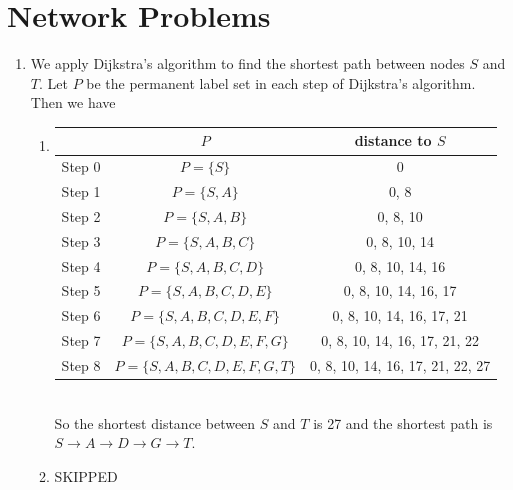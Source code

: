 \section{Network Problems}
\begin{enumerate}
    \item We apply Dijkstra's algorithm to find the shortest path between nodes \(S\) and \(T\). Let \(P\) be the permanent label set in each step of Dijkstra's algorithm. Then we have \\
          \begin{enumerate}[label=(\arabic*)]
              \item \begin{tabular}{|c|c|c|}
                        \hline
                               & \(P\)                                 & distance to \(S\)                \\
                        \hline
                        Step 0 & \(P = \{S\}\)                         & 0                                \\
                        Step 1 & \(P = \{S, A\}\)                      & 0, 8                             \\
                        Step 2 & \(P = \{S, A, B\}\)                   & 0, 8, 10                         \\
                        Step 3 & \(P = \{S, A, B, C\}\)                & 0, 8, 10, 14                     \\
                        Step 4 & \(P = \{S, A, B, C, D\}\)             & 0, 8, 10, 14, 16                 \\
                        Step 5 & \(P = \{S, A, B, C, D, E\}\)          & 0, 8, 10, 14, 16, 17             \\
                        Step 6 & \(P = \{S, A, B, C, D, E, F\}\)       & 0, 8, 10, 14, 16, 17, 21         \\
                        Step 7 & \(P = \{S, A, B, C, D, E, F, G\}\)    & 0, 8, 10, 14, 16, 17, 21, 22     \\
                        Step 8 & \(P = \{S, A, B, C, D, E, F, G, T\}\) & 0, 8, 10, 14, 16, 17, 21, 22, 27 \\
                        \hline
                    \end{tabular} \\
                    So the shortest distance between \(S\) and \(T\) is 27 and the shortest path is \(S \to A \to D \to G \to T\).
              \item {\color{red} SKIPPED}
          \end{enumerate}


\end{enumerate}
